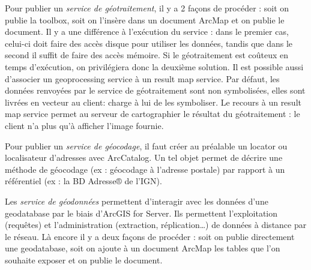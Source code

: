 \documentclass[11pt]{article}
\begin{document}
Pour publier un \textit{service de géotraitement}, il y a 2 façons de procéder : soit on publie la toolbox,  soit on l’insère dans un document ArcMap et on publie le document. Il y a une différence à l’exécution du service : dans le premier cas, celui-ci doit faire des accès disque pour utiliser les données, tandis que dans le second il suffit de faire des accès mémoire. Si le géotraitement est coûteux en temps d’exécution, on privilégiera donc la deuxième solution. Il est possible aussi d’associer un geoprocessing service à un result map service. Par défaut, les données renvoyées par le service de géotraitement sont non symbolisées, elles sont livrées en vecteur au client: charge à lui de les symboliser. Le recours à un result map service permet au serveur de cartographier le résultat du géotraitement : le client n’a plus qu’à afficher l’image fournie.

Pour publier un \textit{service de géocodage}, il faut créer au préalable un locator ou localisateur d’adresses avec ArcCatalog. Un tel objet permet de décrire une méthode de géocodage (ex : géocodage à l’adresse postale) par rapport à un référentiel (ex : la BD Adresse® de l’IGN).

Les \textit{service de géodonnées} permettent d’interagir avec les données d’une geodatabase par le biais d’ArcGIS for Server. Ils permettent l’exploitation (requêtes) et l’administration (extraction, réplication…) de données à distance par le réseau. Là encore il y a deux façons de procéder : soit on publie directement une geodatabase, soit on ajoute à un document ArcMap les tables que l’on souhaite exposer et on publie le document.
\end{document}
